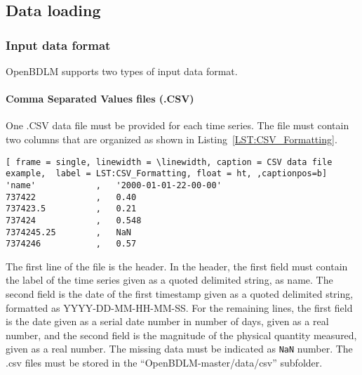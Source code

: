 \subsection{Data loading}
\label{S:DATALOADING}
\subsubsection{Input data format}

OpenBDLM supports two types of input data format.


\paragraph{Comma Separated Values files (.CSV)}
\label{SS:CSVInput}

One .CSV data file must be provided for each time series.
The file must contain two columns that are organized as shown in Listing~\ref{LST:CSV_Formatting}.
\begin{lstlisting}[ frame = single, linewidth = \linewidth, caption = CSV data file example,  label = LST:CSV_Formatting, float = ht, ,captionpos=b]
'name'            ,   '2000-01-01-22-00-00'
737422            ,   0.40
737423.5          ,   0.21
737424            ,   0.548
7374245.25        ,   NaN
7374246           ,   0.57
\end{lstlisting}    
The first line of the file is the header.
In the header, the first field must contain the label of the time series given as a quoted delimited string, as \textquotesingle name\textquotesingle .
The second field is the date of the first timestamp given as a quoted delimited string, formatted as \textquotesingle YYYY-DD-MM-HH-MM-SS\textquotesingle.  
For the remaining lines, the first field is the date given as a serial date number in number of days, given as a real number, and the second field is the magnitude of the physical quantity measured, given as a real number.
The missing data must be indicated as \lstinline[basicstyle = \mlttfamily \small ]!NaN! number.
The .csv files must be stored in the ``OpenBDLM-master/data/csv'' subfolder.

